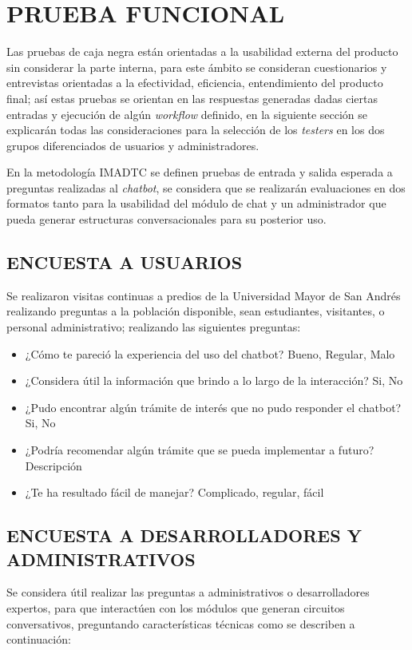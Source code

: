 \documentclass[letter, openright, 12pt]{book}
\begin{document}
{\section{PRUEBA FUNCIONAL}
Las pruebas de caja negra están orientadas a la usabilidad externa del producto sin considerar la parte interna, para este ámbito se consideran cuestionarios y entrevistas orientadas a la efectividad, eficiencia, entendimiento del producto final; así estas pruebas se orientan en las respuestas generadas dadas ciertas entradas y ejecución de algún \textit{workflow} definido, en la siguiente sección se explicarán todas las consideraciones para la selección de los \textit{testers} en los dos grupos diferenciados de usuarios y administradores.

\par 
En la metodología IMADTC se definen pruebas de entrada y salida esperada a preguntas realizadas al \textit{chatbot}, se considera que se realizarán evaluaciones en dos formatos tanto para la usabilidad del módulo de chat y un administrador que pueda generar estructuras conversacionales para su posterior uso. 

\subsection{ENCUESTA A USUARIOS}
Se realizaron visitas continuas a predios de la Universidad Mayor de San Andrés realizando preguntas a la población disponible, sean estudiantes, visitantes, o personal administrativo; realizando las siguientes preguntas:

\begin{itemize}
\item ¿Cómo te pareció la experiencia del uso del chatbot? Bueno, Regular, Malo
\item ¿Considera útil la información que brindo a lo largo de la interacción? Si, No
\item ¿Pudo encontrar algún trámite de interés que no pudo responder el chatbot? Si, No
\item ¿Podría recomendar algún trámite que se pueda implementar a futuro? Descripción
\item ¿Te ha resultado fácil de manejar? Complicado, regular, fácil
\end{itemize}

\subsection{ENCUESTA A DESARROLLADORES Y ADMINISTRATIVOS}
Se considera útil realizar las preguntas a administrativos o desarrolladores expertos, para que interactúen con los módulos que generan circuitos conversativos, preguntando características técnicas como se describen a continuación:

}
\end{document}
